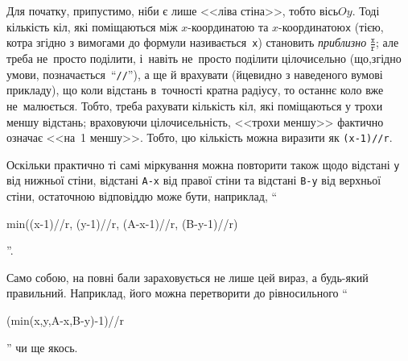 \Tutorial

Для початку, припустимо, ніби є лише <<ліва стіна>>, тобто вісь\nolinebreak[3] $Oy$. Тоді кількість кіл, які поміщаються між $x$-коор\-ди\-на\-тою та $x$-коор\-ди\-на\-тою\nolinebreak[3] \texttt{x} (тією, котра згідно з  вимогами до формули називається~\texttt{x}) становить \emph{приблизно} $\frac{\texttt{x}}{\texttt{r}}$; але треба не~просто поділити, і~навіть не~просто поділити цілочисельно (що,\nolinebreak[2] згідно умови, позначається~``\verb"//"''), а ще й врахувати (й\nolinebreak[2] це\nolinebreak[2] видно з наведеного в\nolinebreak[2] умові прикладу), що коли відстань в~точності кратна радіусу, то останнє коло вже не~малюється. Тобто, треба рахувати кількість кіл, які поміщаються у трохи меншу відстань; враховуючи цілочисельність, <<трохи меншу>> фактично означає <<на~1 меншу>>. Тобто, цю кількість можна виразити як \texttt{(x-1)//r}.

Оскільки практично ті самі міркування можна повторити також щодо відстані \texttt{y} від нижньої стіни, відстані \mbox{\texttt{A-x}} від правої стіни та відстані \mbox{\texttt{B-y}} від верхньої стіни, остаточною відповіддю може бути, наприклад, ``\begin{ttfamily}{\mbox{min((x-1)//r}, \mbox{(y-1)//r}, \mbox{(A-x-1)//r}, \mbox{(B-y-1)//r)}}\end{ttfamily}''. 

Само собою, на повні бали зараховується не лише цей вираз, а будь-який правильний. Наприклад, його можна перетворити до рівносильного ``\begin{ttfamily}{\mbox{(min(x,y,}\nolinebreak[3]\mbox{A-x,}\nolinebreak[3]\mbox{B-y)-1)//r}}\end{ttfamily}'' чи ще якось.